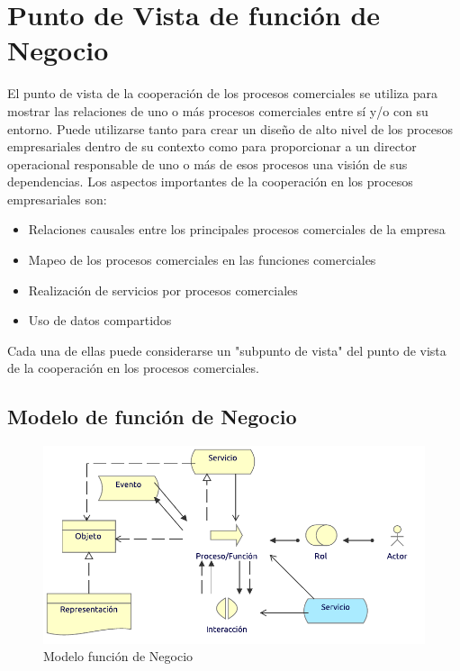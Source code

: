 \section{Punto de Vista de función de Negocio}

El punto de vista de la cooperación de los procesos comerciales se utiliza para mostrar las relaciones de uno o más procesos comerciales entre sí y/o con su entorno. Puede utilizarse tanto para crear un diseño de alto nivel de los procesos empresariales dentro de su contexto como para proporcionar a un director operacional responsable de uno o más de esos procesos una visión de sus dependencias. Los aspectos importantes de la cooperación en los procesos empresariales son:

\begin{itemize}
	\item Relaciones causales entre los principales procesos comerciales de la empresa
	\item Mapeo de los procesos comerciales en las funciones comerciales
	\item Realización de servicios por procesos comerciales
	\item Uso de datos compartidos
\end{itemize}

Cada una de ellas puede considerarse un "subpunto de vista" del punto de vista de la cooperación en los procesos comerciales.

\subsection{Modelo de función de Negocio}
\begin{figure}[h!]
	\centering
	\includegraphics[width=.8\linewidth]{imgs/modelo/ProcesoNegocio}
	\caption{Modelo función de Negocio}
\end{figure}

